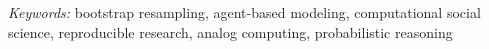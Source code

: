 \documentclass[12pt]{article}
\begin{document}
\noindent%
{\it Keywords:} bootstrap resampling, agent-based modeling, computational
social science, reproducible research, analog computing, probabilistic
reasoning
\vfill

\newpage
{} %






\end{document}
